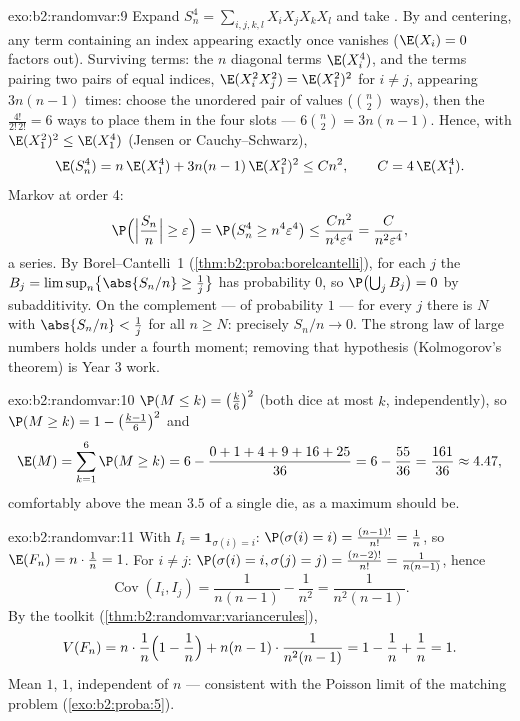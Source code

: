 \begin{solution}{exo:b2:randomvar:9}
Expand $S_n^4 = \sum_{i,j,k,l}X_iX_jX_kX_l$ and take
. By  and centering, any term containing
an index appearing exactly once vanishes ($\E(X_i) = 0$ factors
out). Surviving terms: the $n$ diagonal terms $\E(X_i^4)$, and the
terms pairing two pairs of equal indices, $\E(X_i^2X_j^2) =
\E(X_1^2)^2$ for $i \neq j$, appearing $3n(n-1)$ times: choose
the unordered pair of values ($\binom n2$ ways), then the
$\frac{4!}{2!\,2!} = 6$ ways to place them in the four slots ---
$6\binom n2 = 3n(n-1)$. Hence, with $\E(X_1^2)^2
\leq \E(X_1^4)$ (Jensen or Cauchy--Schwarz),
\[
\E(S_n^4) = n\,\E(X_1^4) + 3n(n-1)\,\E(X_1^2)^2
\leq C n^2,
\qquad C = 4\,\E(X_1^4) .
\]
Markov at order 4:
\[
\P\Bigl(\Bigl|\frac{S_n}{n}\Bigr| \geq \varepsilon\Bigr)
= \P\bigl(S_n^4 \geq n^4\varepsilon^4\bigr)
\leq \frac{Cn^2}{n^4\varepsilon^4}
= \frac{C}{n^2\varepsilon^4} ,
\]
a  series. By Borel--Cantelli~1
(\cref{thm:b2:proba:borelcantelli}), for each $j$ the 
$B_j = \limsup_n\bigl\{\abs{S_n/n} \geq \frac1j\bigr\}$ has
probability $0$, so $\P\bigl(\bigcup_j B_j\bigr) = 0$ by
 subadditivity. On the complement --- of probability $1$
--- for every $j$ there is $N$ with $\abs{S_n/n} < \frac1j$ for
all $n \geq N$: precisely $S_n/n \to 0$. The strong law of large
numbers holds under a fourth moment; removing that hypothesis
(Kolmogorov's theorem) is Year 3 work.
\end{solution}

\begin{solution}{exo:b2:randomvar:10}
$\P(M \leq k) = \bigl(\frac k6\bigr)^2$ (both dice at most
$k$, independently), so $\P(M \geq k) = 1 -
\bigl(\frac{k-1}6\bigr)^2$ and
\[
\E(M) = \sum_{k=1}^6\P(M \geq k)
= 6 - \frac{0 + 1 + 4 + 9 + 16 + 25}{36}
= 6 - \frac{55}{36} = \frac{161}{36} \approx 4.47 ,
\]
comfortably above the mean $3.5$ of a single die, as a
maximum should be.
\end{solution}

\begin{solution}{exo:b2:randomvar:11}
With $I_i = \mathbf 1_{\sigma(i) = i}$: $\P(\sigma(i) = i) =
\frac{(n-1)!}{n!} = \frac1n$, so $\E(F_n) = n\cdot\frac1n =
1$. For $i \neq j$: $\P(\sigma(i) = i, \sigma(j) = j) =
\frac{(n-2)!}{n!} = \frac1{n(n-1)}$, hence
\[
\operatorname{Cov}(I_i, I_j) = \frac1{n(n-1)} - \frac1{n^2}
= \frac{1}{n^2(n-1)} .
\]
By the  toolkit
(\cref{thm:b2:randomvar:variancerules}),
\[
V(F_n) = n\cdot\frac1n\Bigl(1 - \frac1n\Bigr)
+ n(n-1)\cdot\frac1{n^2(n-1)}
= 1 - \frac1n + \frac1n = 1 .
\]
Mean $1$,  $1$, independent of $n$ --- consistent
with the Poisson limit of the matching problem
(\cref{exo:b2:proba:5}).
\end{solution}


